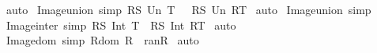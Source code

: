 \begin{isabellebody}
%
\isadelimproof
%
\endisadelimproof
%
\isatagproof
{}\isamarkupfalse%
\ auto\isanewline
{}\isamarkupfalse%
%
\endisatagproof
{\isafoldproof}%
%
\isadelimproof
\isanewline
%
\endisadelimproof
\isanewline
\isanewline
{}\isamarkupfalse%
\ Image{\isacharunderscore}union\ {\isacharbrackleft}simp{\isacharbrackright}{\isacharcolon}\ {\isachardoublequoteopen}R{\isacharparenleft}{\isacharbar}{\isacharparenleft}S\ Un\ T{\isacharparenright}\ {\isacharbar}{\isacharparenright}\ {\isacharequal}\ {\isacharparenleft}R{\isacharparenleft}{\isacharbar}S{\isacharbar}{\isacharparenright}{\isacharparenright}\ Un\ {\isacharparenleft}R{\isacharparenleft}{\isacharbar}T{\isacharbar}{\isacharparenright}{\isacharparenright}{\isachardoublequoteclose}\isanewline
%
\isadelimproof
%
\endisadelimproof
%
\isatagproof
{}\isamarkupfalse%
\ auto\isanewline
{}\isamarkupfalse%
%
\endisatagproof
{\isafoldproof}%
%
\isadelimproof
\isanewline
%
\endisadelimproof
{}\isamarkupfalse%
\ Image{\isacharunderscore}union\ {\isacharbrackleft}simp{\isacharbrackright}\isanewline
\isanewline
{}\isamarkupfalse%
\ Image{\isacharunderscore}inter\ {\isacharbrackleft}simp{\isacharbrackright}{\isacharcolon}\ {\isachardoublequoteopen}R{\isacharparenleft}{\isacharbar}{\isacharparenleft}S\ Int\ T{\isacharparenright}{\isacharbar}{\isacharparenright}\ {\isacharless}{\isacharequal}\ {\isacharparenleft}R{\isacharparenleft}{\isacharbar}S{\isacharbar}{\isacharparenright}{\isacharparenright}\ Int\ {\isacharparenleft}R{\isacharparenleft}{\isacharbar}T{\isacharbar}{\isacharparenright}{\isacharparenright}{\isachardoublequoteclose}\isanewline
%
\isadelimproof
%
\endisadelimproof
%
\isatagproof
{}\isamarkupfalse%
\ auto\isanewline
{}\isamarkupfalse%
%
\endisatagproof
{\isafoldproof}%
%
\isadelimproof
\isanewline
%
\endisadelimproof
\isanewline
{}\isamarkupfalse%
\ Image{\isacharunderscore}dom\ {\isacharbrackleft}simp{\isacharbrackright}{\isacharcolon}\ {\isachardoublequoteopen}R{\isacharparenleft}{\isacharbar}dom\ {\isacharparenleft}R{\isacharparenright}{\isacharbar}{\isacharparenright}\ {\isacharequal}\ ran{\isacharparenleft}R{\isacharparenright}{\isachardoublequoteclose}\isanewline
%
\isadelimproof
%
\endisadelimproof
%
\isatagproof
{}\isamarkupfalse%
\ auto\isanewline
{}\isamarkupfalse%
%
\endisatagproof
{\isafoldproof}%
%
\isadelimproof
%
\endisadelimproof
%
\isamarkuptrue%
\isamarkupfalse%

\end{isabellebody}
